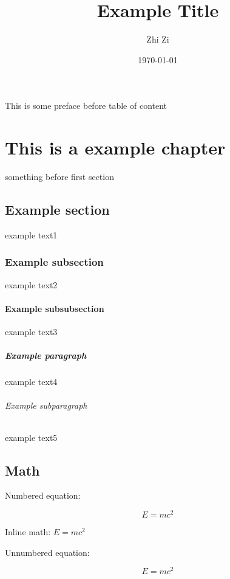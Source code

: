 \documentclass{book}
\title{Example Title}
\author{Zhi Zi}
\date{\today}
\begin{document}
\maketitle

This is some preface before table of content

\tableofcontents

\chapter{This is a example chapter}

something before first section

\section{Example section}

example text1

\subsection{Example subsection}

example text2

\subsubsection{Example subsubsection}

example text3

\paragraph{Example paragraph}

example text4

\subparagraph{Example subparagraph}

example text5

\section{Math}

Numbered equation:

\begin{equation}
	E = m c^2
\end{equation}

Inline math: \( E = mc^2 \)

Unnumbered equation:

\begin{equation*}
	E = mc^2
\end{equation*}
\end{document}
